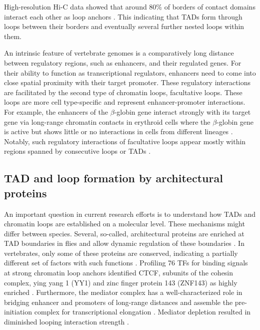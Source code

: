 \documentclass[a4paper,twoside=true,openright,parskip=full,chapterprefix=true,11pt,headings=normal,bibliography=totoc,listof=totoc,titlepage=on,captions=tableabove,draft=false]{scrreprt}
\theoremstyle{definition}
\theoremstyle{definition}
\theoremstyle{definition}
\theoremstyle{remark}
\begin{document}
High-resolution Hi-C data showed that around 80\% of borders of contact
domains interact each other as loop anchors \citep{Rao2014}. This
indicating that TADs form through loops between their borders and
eventually several further nested loops within them.

An intrinsic feature of vertebrate genomes is a comparatively long
distance between regulatory regions, such as enhancers, and their
regulated genes. For their ability to function as transcriptional
regulators, enhancers need to come into close spatial proximity with
their target promoter. These regulatory interactions are facilitated by
the second type of chromatin loops, facultative loops. These loops are
more cell type-specific and represent enhancer-promoter interactions.
For example, the enhancers of the \(\beta\)-globin gene interact
strongly with its target gene via long-range chromatin contacts in
erythroid cells where the \(\beta\)-globin gene is active but shows
little or no interactions in cells from different lineages
\citep{Palstra2003}. Notably, such regulatory interactions of
facultative loops appear mostly within regions spanned by consecutive
loops or TADs \citep{Hnisz2016a}.

\hypertarget{loop-mechanism}{%
\subsection{TAD and loop formation by architectural
proteins}\label{loop-mechanism}}

An important question in current research efforts is to understand how
TADs and chromatin loops are established on a molecular level. These
mechanisms might differ between species. Several, so-called,
architectural proteins are enriched at TAD boundaries in flies and allow
dynamic regulation of these boundaries
\citep{Bortle2014, Gomez-Diaz2014}. In vertebrates, only some of these
proteins are conserved, indicating a partially different set of factors
with such functions \citep{Phillips-Cremins2013, Bonev2016}. Profiling
76 TFs for binding signals at strong chromatin loop anchors identified
CTCF, subunits of the cohesin complex, ying yang 1 (YY1) and zinc finger
protein 143 (ZNF143) as highly enriched \citep{Rao2014}. Furthermore,
the mediator complex has a well-characterized role in bridging enhancer
and promoters of long-range distances and assemble the pre-initiation
complex for transcriptional elongation \citep{Allen2015}. Mediator
depletion resulted in diminished looping interaction strength
\citep{Bonev2016}.
\end{document}
